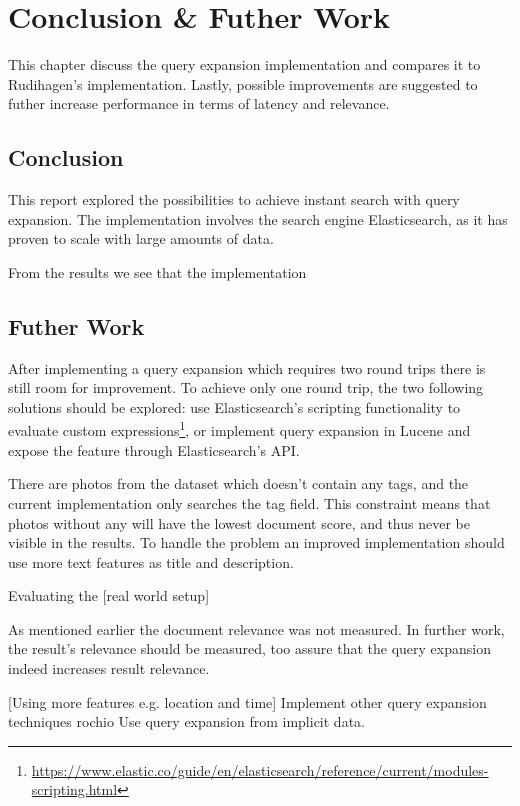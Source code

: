 \chapter{Conclusion \& Futher Work}
\label{ch:conclusion}
This chapter discuss the query expansion implementation and compares it to Rudihagen's implementation.
Lastly, possible improvements are suggested to futher increase performance in terms of latency and relevance.

\section{Conclusion}
This report explored the possibilities to achieve instant search with query expansion.
The implementation involves the search engine Elasticsearch, as it has proven to scale with large amounts of data.

From the results we see that the implementation


\section{Futher Work}
After implementing a query expansion which requires two round trips there is still room for improvement.
To achieve only one round trip, the two following solutions should be explored:
use Elasticsearch's scripting functionality to evaluate custom expressions\footnote{\url{https://www.elastic.co/guide/en/elasticsearch/reference/current/modules-scripting.html}},
or implement query expansion in Lucene and expose the feature through Elasticsearch's API.

There are photos from the dataset which doesn't contain any tags,
and the current implementation only searches the tag field.
This constraint means that photos without any will have the lowest document score, and thus never be visible in the results.
To handle the problem an improved implementation should use more text features as title and description.

Evaluating the
[real world setup]

As mentioned earlier the document relevance was not measured.
In further work, the result's relevance should be measured, too assure that the query expansion indeed increases result relevance.


[Using more features e.g. location and time]
Implement other query expansion techniques rochio
Use query expansion from implicit data.
